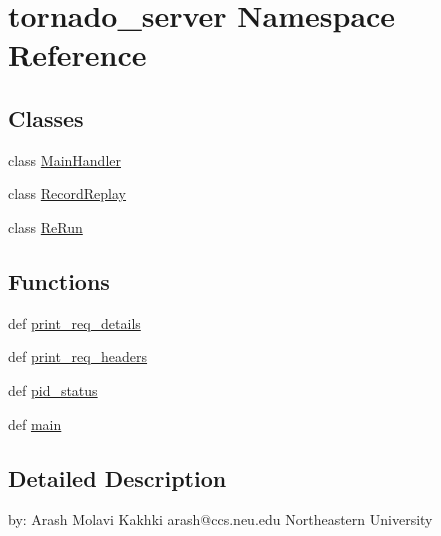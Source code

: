 \hypertarget{namespacetornado__server}{\section{tornado\-\_\-server Namespace Reference}
\label{namespacetornado__server}
}
\subsection*{Classes}
\begin{DoxyCompactItemize}
\item 
class \hyperlink{classtornado__server_1_1_main_handler}{Main\-Handler}
\item 
class \hyperlink{classtornado__server_1_1_record_replay}{Record\-Replay}
\item 
class \hyperlink{classtornado__server_1_1_re_run}{Re\-Run}
\end{DoxyCompactItemize}
\subsection*{Functions}
\begin{DoxyCompactItemize}
\item 
def \hyperlink{namespacetornado__server_af5c4e1dbe49ac1fd487f7a81d88d90ff}{print\-\_\-req\-\_\-details}
\item 
def \hyperlink{namespacetornado__server_aba1ab110c678f99f71be9ab9423398f4}{print\-\_\-req\-\_\-headers}
\item 
def \hyperlink{namespacetornado__server_a67086ec0246941bad1dcd70e34bf7cb8}{pid\-\_\-status}
\item 
def \hyperlink{namespacetornado__server_af4c6404a74c334144a579fb9a158f3c7}{main}
\end{DoxyCompactItemize}


\subsection{Detailed Description}
\begin{DoxyVerb} by:    Arash Molavi Kakhki
arash@ccs.neu.edu
Northeastern University
\end{DoxyVerb}
 

